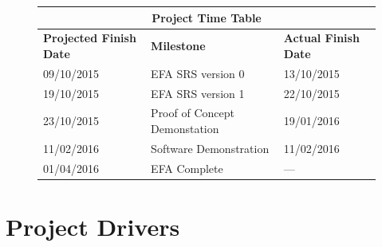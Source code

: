 \documentclass[12pt]{report}
\begin{document}
\newpage

\tableofcontents
\listoffigures
\listoftables

\newpage
{} %

\setlength{\arrayrulewidth}{0.35mm}
\setlength{\tabcolsep}{16pt}
\renewcommand{\arraystretch}{2}
\begin{figure}
	\begin{adjustwidth}{-1cm}{}
	\begin{tabular}{ |m{4cm}|m{6cm}|m{4cm}|  }
		\hline
		\multicolumn{3}{|c|}{\bfseries{Project Time Table}} \\
		\hline
		\bfseries{Projected Finish Date}& \bfseries{Milestone} & 
		\bfseries{Actual Finish Date} \\
		\hline
		 09/10/2015& EFA SRS version 0 & 13/10/2015 \\
		19/10/2015 & EFA SRS version 1  & 22/10/2015 \\
		23/10/2015 & Proof of Concept Demonstation & 19/01/2016 \\
		11/02/2016 & Software Demonstration & 11/02/2016 \\
		01/04/2016 & EFA Complete & --- \\
		\hline
	\end{tabular}
	\end{adjustwidth}
\end{figure}
\chapter{Project Drivers}\label{ch:Intro}
\end{document}
